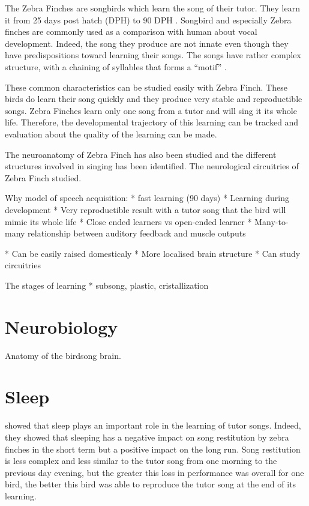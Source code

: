 \documentclass{report}
\begin{document}
The Zebra Finches are songbirds which learn the song of their tutor. They learn
it from 25 days post hatch (DPH) to 90 DPH \parencite{liu_juvenile_2004}.
Songbird and especially Zebra finches are commonly used as a comparison with
human about vocal development. Indeed, the song they produce are not innate
even though they have predispositions toward learning their songs. The songs
have rather complex structure, with a chaining of syllables that forms a
``motif'' \parencite{doupe_birdsong_1999, margoliash_evaluating_2002}.

These common characteristics can be studied easily with Zebra Finch. These birds
do learn their song quickly and they produce very stable and reproductible
songs. Zebra Finches learn only one song from a tutor and will sing it its whole
life. Therefore, the developmental trajectory of this learning can be tracked
and evaluation about the quality of the learning can be made.

The neuroanatomy of Zebra Finch has also been studied and the different
structures involved in singing has been identified. The neurological circuitries
of Zebra Finch studied.



Why model of speech acquisition:
* fast learning (90 days)
* Learning during development \cite{margoliash_offline_2003}
* Very reproductible result with a tutor song that the bird will mimic its whole
  life \cite{margoliash_sleep_2010}
    * Close ended learners vs open-ended learner \cite{margoliash_sleep_2010}
* Many-to-many relationship between auditory feedback and muscle outputs \cite{margoliash_offline_2003}

* Can be easily raised domesticaly \parencite{helekar_time_2013}
* More localised brain structure \parencite{helekar_time_2013}
    * Can study circuitries


The stages of learning
* subsong, plastic, cristallization \cite{margoliash_sleep_2010}


\section{Neurobiology}

Anatomy of the birdsong brain.

\section{Sleep}

\textcite{deregnaucourt_how_2005} showed that sleep plays an important role in
the learning of tutor songs. Indeed, they showed that sleeping has a negative
impact on song restitution by zebra finches in the short term but a positive
impact on the long run. Song restitution is less complex and less similar to the
tutor song from one morning to the previous day evening, but the greater this
loss in performance was overall for one bird, the better this bird was able to
reproduce the tutor song at the end of its learning.
\end{document}
